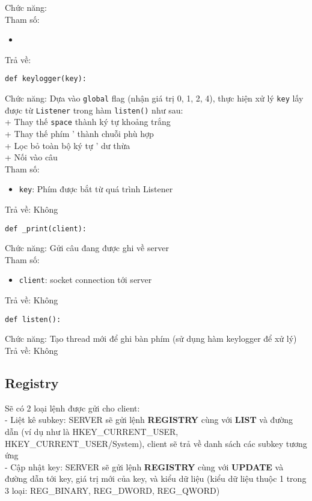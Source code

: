 \begin{lstlisting}

\end{lstlisting}
Chức năng: \\
Tham số: 
\begin{itemize}
\item \lstinline{}
\end{itemize}
Trả về: 
\begin{lstlisting}
def keylogger(key):
\end{lstlisting}
Chức năng: Dựa vào \lstinline{global} flag (nhận giá trị 0, 1, 2, 4), thực hiện xử lý \lstinline{key} lấy được từ \lstinline{Listener} trong hàm \lstinline{listen()} như sau:\\
+ Thay thế \lstinline{space} thành ký tự khoảng trắng\\
+ Thay thế phím ' thành chuỗi phù hợp \\
+ Lọc bỏ toàn bộ ký tự ' dư thừa \\
+ Nối vào câu \\
Tham số: 
\begin{itemize}
\item \lstinline{key}: Phím được bắt từ quá trình Listener
\end{itemize}
Trả về: Không

\begin{lstlisting}
def _print(client):
\end{lstlisting}
Chức năng: Gửi câu đang được ghi về server\\
Tham số: 
\begin{itemize}
\item \lstinline{client}: socket connection tới server
\end{itemize}
Trả về: Không

\begin{lstlisting}
def listen():
\end{lstlisting}
Chức năng: Tạo thread mới để ghi bàn phím (sử dụng hàm keylogger để xử lý)\\
Trả về: Không

\subsection{Registry}
Sẽ có 2 loại lệnh được gửi cho client:\\
- Liệt kê subkey: SERVER sẽ gửi lệnh \textbf{REGISTRY} cùng với \textbf{LIST} và đường dẫn (ví dụ như là HKEY_CURRENT_USER, HKEY_CURRENT_USER/System), client sẽ trả về danh sách các subkey tương ứng\\
- Cập nhật key: SERVER sẽ gửi lệnh \textbf{REGISTRY} cùng với \textbf{UPDATE} và đường dẫn tới key, giá trị mới của key, và kiểu dữ liệu (kiểu dữ liệu thuộc 1 trong 3 loại: REG_BINARY, REG_DWORD, REG_QWORD)\\

